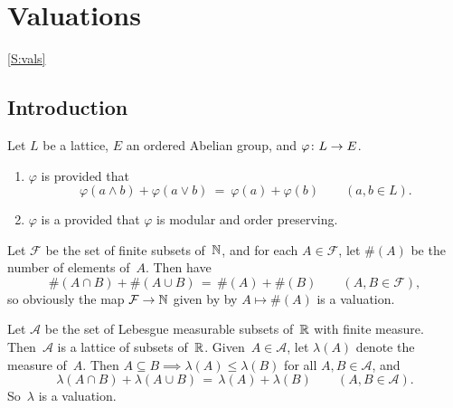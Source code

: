 \documentclass[main.tex]{subfiles}
\begin{document}
\section{Valuations}
\ref{S:vals}
\subsection{Introduction}
\noindent
%
%
\begin{dfn}
\label{D:val}
Let $L$ be a lattice, $E$ an ordered Abelian group,
and $\varphi\colon L \rightarrow E$.
\begin{enumerate}
\item
\label{D:val-mod}
$\varphi$ is  provided that
\begin{equation*}
\varphi(a\wedge b) + \varphi(a \vee b)
\ =\ 
\varphi(a) + \varphi(b)
\qquad(a,b\in L).
\end{equation*}

\item
\label{D:val-val}
$\varphi$ is a 
provided that $\varphi$ is modular and order preserving.
\end{enumerate}
\end{dfn}

\begin{ex}
Let $\mathcal{F}$ be the set of finite subsets of~$\mathbb{N}$,
and for each $A\in \mathcal{F}$,
let $\#(A)$ be the number of elements of~$A$.
Then have 
\begin{equation*}
\#(A\cap B) + \#(A\cup B) \,=\, \#(A) + \#(B)
\qquad(A,B\in\mathcal{F}),
\end{equation*}
so obviously the map $\mathcal{F} \rightarrow \mathbb{N}$
given by by $A\mapsto \#(A)$ is a valuation.
\end{ex}

\begin{ex}
\label{E:lmeas-val}
Let $\mathcal{A}$ be the set of Lebesgue measurable
subsets of~$\mathbb{R}$ with finite measure.
Then~$\mathcal{A}$ is a lattice of subsets of~$\mathbb{R}$.
Given~$A\in\mathcal{A}$,
let $\lambda(A)$ denote the measure of~$A$.
Then $A\subseteq B \implies \lambda(A)\leq \lambda (B)$
for all $A,B\in \mathcal{A}$,
and 
\begin{equation*}
\lambda(A\cap B) + \lambda(A\cup B) \,=\, \lambda(A) + \lambda(B)
\qquad(A,B\in\mathcal{A}).
\end{equation*}
So~$\lambda$ is a valuation.
\end{ex}
\end{document}
